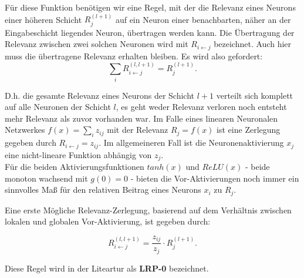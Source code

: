 \documentclass[11pt,a4paper]{article}
\numberwithin{equation}{section}
\begin{document}
	
	Für diese Funktion benötigen wir eine Regel, mit der die Relevanz eines Neurons einer höheren Schicht $R_j^{(l+1)}$ auf ein Neuron einer benachbarten, näher an der Eingabeschicht liegendes Neuron, übertragen werden kann.
	Die Übertragung der Relevanz zwischen zwei solchen Neuronen wird mit $R_{i\leftarrow j}$ bezeichnet. Auch hier muss die übertragene Relevanz erhalten bleiben. Es wird also gefordert:
	\begin{equation}
	\sum_i{R_{i\leftarrow j}^{(l,l+1)}} = R_j^{(l+1)}.
	\end{equation}
	
	D.h. die gesamte Relevanz eines Neurons der Schicht $l+1$ verteilt sich komplett auf alle Neuronen der Schicht $l$, es geht weder Relevanz verloren noch entsteht mehr Relevanz als zuvor vorhanden war.
	Im Falle eines linearen Neuronalen Netzwerkes $f(x) = \sum_i{z_{ij}}$ mit der Relevanz $R_j = f(x)$ ist eine Zerlegung gegeben durch $R_{i\leftarrow j} = z_{ij}.$
	Im allgemeineren Fall ist die Neuronenaktivierung $x_j$ eine nicht-lineare Funktion abhängig von $z_j$.\\
	Für die beiden Aktivierungsfunktionen $tanh(x)$ und $ReLU(x)$ - beide monoton wachsend mit $g(0)=0$ - bieten die Vor-Aktivierungen noch immer ein sinnvolles Maß für den relativen Beitrag eines Neurons $x_i$ zu $R_j$.
	
	Eine erste Mögliche Relevanz-Zerlegung, basierend auf dem Verhältnis zwischen lokalen und globalen Vor-Aktivierung, ist gegeben durch:
	
	\begin{equation}
	R_{i\leftarrow j}^{(l,l+1)} = \frac{z_{ij}}{z_j} \cdot R_j^{(l+1)}. \label{eq:lrp_regel}
	\end{equation}

	Diese Regel wird in der Liteartur als \textbf{LRP-0} bezeichnet.
	
\end{document}
